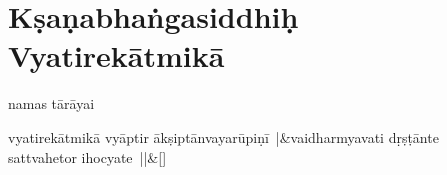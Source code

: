 \documentclass[article,12pt,a4paper]{memoir}%
\newcounter{parCount}
\begin{document}
	  
	  
	    
	    \endnumbering%
	    \endgroup
	    
	  
	  
	
	    
	    \begingroup
	    \beginnumbering%
	    
	  
\chapter*[{Kṣaṇabhaṅgasiddhiḥ Vyatirekātmikā}]{Kṣaṇabhaṅgasiddhiḥ Vyatirekātmikā}\label{Kṣaṇabhaṅgasiddhiḥ_Vyatirekātmikā}

	  \pstart \leavevmode%
	\hphantom{.}\label{thakur75-83.5}namas tārāyai 
	    \pend%
	  
	    
	    \stanza[\smallbreak]
	  \label{thakur75-83.6}vyatirekātmikā vyāptir ākṣiptānvayarūpiṇī |&vaidharmyavati dṛṣṭānte sattvahetor ihocyate ||\&[\smallbreak]
	  
	  
	  
\end{document}
